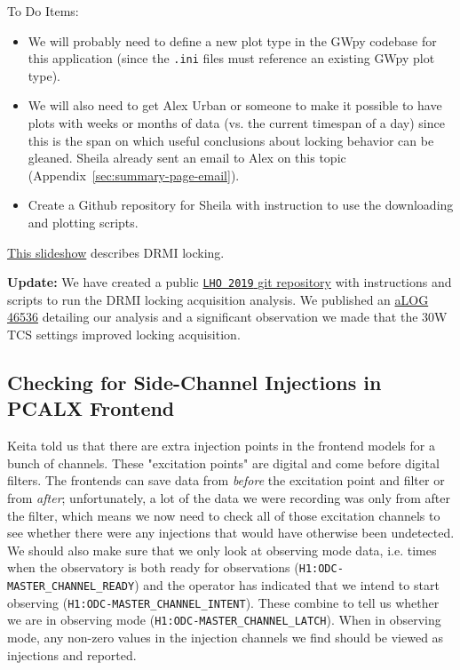 \documentclass{article}
\newcommand*{\TODO}{\textcolor{todo}}
\begin{document}
To Do Items:

\begin{itemize}
    \item \TODO{We will probably need to define a new plot type in the GWpy codebase for this application (since the \texttt{.ini} files must reference an existing GWpy plot type).}
    \item \TODO{We will also need to get Alex Urban or someone to make it possible to have plots with weeks or months of data (vs. the current timespan of a day) since this is the span on which useful conclusions about locking behavior can be gleaned. Sheila already sent an email to Alex on this topic (Appendix~\ref{sec:summary-page-email}).}
    \item \TODO{Create a Github repository for Sheila with instruction to use the downloading and plotting scripts.}
\end{itemize}
\href{https://dcc.ligo.org/LIGO-G1301236}{This slideshow} describes DRMI locking.

\textbf{Update:} We have created a public  \href{https://github.com/ysa2106/LHO_2019}{\texttt{LHO 2019} git repository} with instructions and scripts to run the DRMI locking acquisition analysis. We published an \href{https://alog.ligo-wa.caltech.edu/aLOG/index.php?callRep=46536}{aLOG 46536} detailing our analysis and a significant observation we made that the 30W TCS settings improved locking acquisition.

\TODO{\subsection{Checking for Side-Channel Injections in PCALX Frontend}
}

Keita told us that there are extra injection points in the frontend models for a bunch of channels. These "excitation points" are digital and come before digital filters. The frontends can save data from \textit{before} the excitation point and filter or from \textit{after}; unfortunately, a lot of the data we were recording was only from after the filter, which means we now need to check all of those excitation channels to see whether there were any injections that would have otherwise been undetected. We should also make sure that we only look at observing mode data, i.e. times when the observatory is both ready for observations (\texttt{H1:ODC-MASTER\_CHANNEL\_READY}) and the operator has indicated that we intend to start observing (\texttt{H1:ODC-MASTER\_CHANNEL\_INTENT}). These combine to tell us whether we are in observing mode (\texttt{H1:ODC-MASTER\_CHANNEL\_LATCH}). When in observing mode, any non-zero values in the injection channels we find should be viewed as injections and reported.
\end{document}
